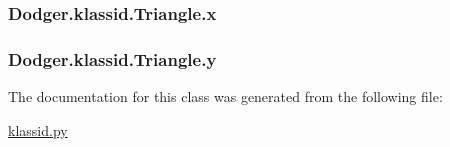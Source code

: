 \subsubsection[{x}]{\setlength{\rightskip}{0pt plus 5cm}Dodger.\+klassid.\+Triangle.\+x}\label{class_dodger_1_1klassid_1_1_triangle_a17a330d3cf14156818f35ca702d11bee}
\hypertarget{class_dodger_1_1klassid_1_1_triangle_a36eb6984b804d8702084420f442d7917}{}
\subsubsection[{y}]{\setlength{\rightskip}{0pt plus 5cm}Dodger.\+klassid.\+Triangle.\+y}\label{class_dodger_1_1klassid_1_1_triangle_a36eb6984b804d8702084420f442d7917}


The documentation for this class was generated from the following file\+:\begin{DoxyCompactItemize}
\item 
\hyperlink{klassid_8py}{klassid.\+py}\end{DoxyCompactItemize}
